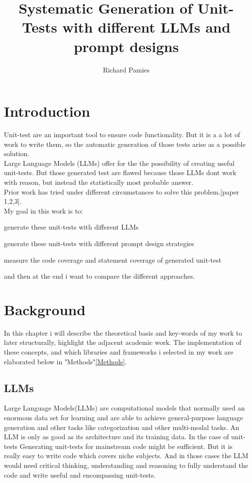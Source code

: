 \documentclass[a4paper,11pt,oneside]{memoir}
\title{Systematic Generation of Unit-Tests with different LLMs and prompt designs}
\author{Richard Pamies}
\begin{document}
\frontmatter

\smarttitle

\newpage
\tableofcontents

\mainmatter

\chapter{Introduction}
\label{Introduction}
Unit-test are an important tool to ensure code functionality. But it is a a lot of work to write them, so the automatic generation of those tests arise as a possible solution.
\\
Large Language Models (LLMs) offer for the the possibility of creating useful unit-tests. But those generated test are flawed because those LLMs dont work with reason, but instead the statistically most probable answer.
\\
Prior work  has tried under different circumstances to solve this problem.[paper 1,2,3].
\\
My goal in this work is to:
\begin{center}
    \item generate these unit-tests with different LLMs
    \item generate these unit-tests with different prompt design strategies
    \item measure the code coverage and statement coverage of generated unit-test
\end{center}
and then at the end i want to compare the different approaches.


\chapter{Background}
\label{Background}
In this chapter i will describe the theoretical basis and key-words of my work to later structurally, highlight the adjacent academic work. The implementation of these concepts, and which libraries and frameworks i selected in my work are elaborated below in "Methods"\ref{Methods}.
\section{LLMs}
Large Language Models(LLMs) are computational models that normally used an enormous data set for learning and are able to achieve general-purpose language generation and other tasks like categorization and other multi-modal tasks. An LLM is only as good as its architecture and its training data. 
In the case of unit-tests
Generating unit-tests for mainstream code might be sufficient. But it is really easy to write code which covers niche subjects. And in those cases the LLM would need critical thinking, understanding and reasoning to fully understand the code and write useful and encompassing unit-tests.
\end{document}
